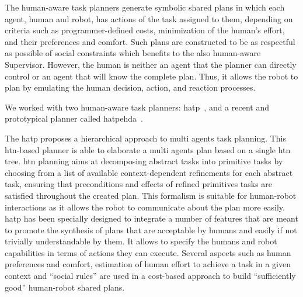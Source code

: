 \documentclass[a4paper,11pt,twoside]{StyleThese}
\begin{document}
The human-aware task planners generate symbolic shared plans in which each agent, human and robot, has actions of the task assigned to them, depending on criteria such as programmer-defined costs, minimization of the human's effort, and their preferences and comfort. Such plans are constructed to be as respectful as possible of social constraints which benefits to the also human-aware Supervisor. However, the human is neither an agent that the planner can directly control or an agent that will know the complete plan. Thus, it allows the robot to plan by emulating the human decision, action, and reaction processes. 

We worked with two human-aware task planners: \acrfull{hatp}~\cite{lallement_2014_hatp}, and a recent and prototypical planner called \acrfull{hatpehda}~\cite{buisan_2021_human}.

The \acrfull{hatp} proposes a hierarchical approach to multi agents task planning. This \acrfull{htn}-based planner is able to elaborate a multi agents plan based on a single \acrshort{htn} tree. \acrshort{htn} planning aims at decomposing abstract tasks into primitive tasks by choosing from a list of available context-dependent refinements for each abstract task, ensuring that preconditions and effects of refined primitives tasks are satisfied throughout the created plan. This formalism is suitable for human-robot interactions as it allows the robot to communicate about the plan more easily. \acrshort{hatp} has been specially designed to integrate a number of features that are meant to promote the synthesis of plans that are acceptable by humans and easily if not trivially understandable by them. It allows to specify the humans and robot capabilities in terms of actions they can execute. Several aspects such as human preferences and comfort, estimation of human effort to achieve a task in a given context and ``social rules'' are used in a cost-based approach to build ``sufficiently good'' human-robot shared plans.
\end{document}
